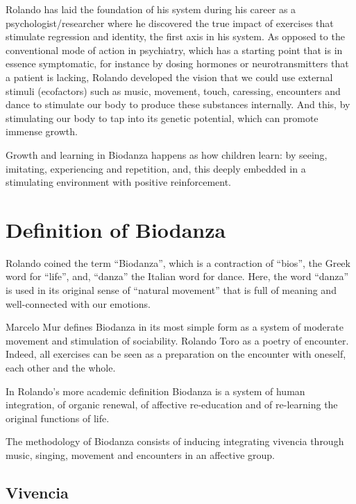 \documentclass[
  11pt,
]{book}
\begin{document}
Rolando has laid the foundation of his system during his career as a psychologist/researcher where he discovered the true impact of exercises that stimulate regression and identity, the first axis in his system. As opposed to the conventional mode of action in psychiatry, which has a starting point that is in essence symptomatic, for instance by dosing hormones or neurotransmitters that a patient is lacking, Rolando developed the vision that we could use external stimuli (ecofactors) such as music, movement, touch, caressing, encounters and dance to stimulate our body to produce these substances internally. And this, by stimulating our body to tap into its genetic potential, which can promote immense growth.

Growth and learning in Biodanza happens as how children learn: by seeing, imitating, experiencing and repetition, and, this deeply embedded in a stimulating environment with positive reinforcement.

\hypertarget{definition-of-biodanza}{%
\section{Definition of Biodanza}\label{definition-of-biodanza}}

Rolando coined the term ``Biodanza'', which is a contraction of ``bios'', the Greek word for ``life'', and, ``danza'' the Italian word for dance. Here, the word ``danza'' is used in its original sense of ``natural movement'' that is full of meaning and well-connected with our emotions.

Marcelo Mur defines Biodanza in its most simple form as a system of moderate movement and stimulation of sociability.
Rolando Toro as a poetry of encounter. Indeed, all exercises can be seen as a preparation on the encounter with oneself, each other and the whole.

In Rolando's more academic definition Biodanza is a system of human integration, of organic renewal, of affective re-education and of re-learning the original functions of life.

The methodology of Biodanza consists of inducing integrating vivencia through music, singing, movement and encounters in an affective group.

\hypertarget{vivencia}{%
\subsection{Vivencia}\label{vivencia}}
\end{document}

